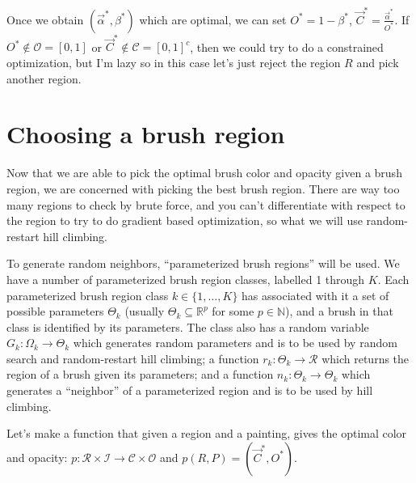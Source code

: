 \documentclass[12pt]{article}
\newcommand{\reals}{\mathbb{R}}
\newcommand{\R}{\reals}
\begin{document}
Once we obtain $(\vec \alpha^*, \beta^*)$ which are optimal, we can set $O^* = 1 - \beta^*$, $\vec C^* = \frac{\vec \alpha^*}{O^*}$. If $O^* \notin \mathcal O = [0,1]$ or $\vec C^* \notin \mathcal C = [0,1]^c$, then we could try to do a constrained optimization, but I'm lazy so in this case let's just reject the region $R$ and pick another region.

\section{Choosing a brush region}
Now that we are able to pick the optimal brush color and opacity given a brush region, we are concerned with picking the best brush region. There are way too many regions to check by brute force, and you can't differentiate with respect to the region to try to do gradient based optimization, so what we will use random-restart hill climbing.

To generate random neighbors, ``parameterized brush regions'' will be used. We have a number of parameterized brush region classes, labelled 1 through $K$. Each parameterized brush region class $k \in \{1,\dots,K\}$ has associated with it a set of possible parameters $\Theta_k$ (usually $\Theta_k \subseteq \R^p$ for some $p \in \mathbb{N}$), and a brush in that class is identified by its parameters. The class also has a random variable $G_k : \Omega_k \to \Theta_k$ which generates random parameters and is to be used by random search and random-restart hill climbing; a function $r_k : \Theta_k \to \mathcal{R}$ which returns the region of a brush given its parameters; and a function $n_k : \Theta_k \to \Theta_k$ which generates a ``neighbor'' of a parameterized region and is to be used by hill climbing.

Let's make a function that given a region and a painting, gives the optimal color and opacity: $p : \mathcal R \times \mathcal I \to \mathcal C \times \mathcal O$ and $p(R, P) = (\vec C^*, O^*)$.
\end{document}
